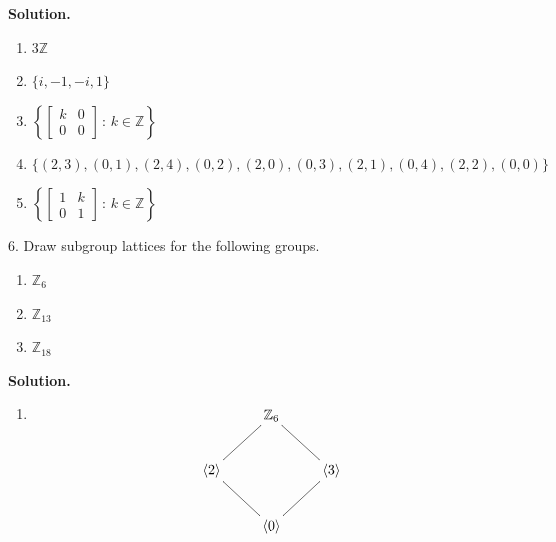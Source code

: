 \documentclass[10pt,]{book}
\theoremstyle{plain}
\theoremstyle{definition}
\theoremstyle{definition}
\theoremstyle{definition}
\theoremstyle{definition}
\numberwithin{equation}{section}
\def\Z{\mathbb{Z}}
\newcommand{\amp}{ & }
\begin{document}
\begin{exerciselist}
\par\smallskip
\par\smallskip
\noindent\textbf{Solution.}\hypertarget{solution-38}{}\quad
\leavevmode%
\begin{enumerate}[label=(\alph*)]
\item\hypertarget{li-310}{}
          \(3\Z\)
\item\hypertarget{li-311}{}
          \(\{i,-1,-i,1\}\)
\item\hypertarget{li-312}{}
          \(\left\{\left[
          \begin{array}{cc}
          k \amp  0 \\
          0 \amp  0
          \end{array} 
          \right]\,:\,k\in \Z
          \right\}\)
\item\hypertarget{li-313}{}
          \(\{(2,3),(0,1),(2,4),(0,2),(2,0),(0,3),(2,1),(0,4),(2,2),(0,0)\}\)
\item\hypertarget{li-314}{}
          \(\left\{\left[
          \begin{array}{cc}
          1 \amp  k \\
          0 \amp  1
          \end{array} 
          \right]\,:\,k\in \Z\right\}\)
\end{enumerate}
\item[6.]\hypertarget{exercise-39}{}
        Draw subgroup lattices for the following groups.
        \leavevmode%
\begin{multicols}{3}
\begin{enumerate}[label=(\alph*)]
\item\hypertarget{li-315}{}
              \(\Z_6\)
\item\hypertarget{li-316}{}
              \(\Z_{13}\)
\item\hypertarget{li-317}{}
              \(\Z_{18}\)
\end{enumerate}
\end{multicols}

\par\smallskip
\par\smallskip
\noindent\textbf{Solution.}\hypertarget{solution-39}{}\quad
\leavevmode%
\begin{enumerate}[label=(\alph*)]
\item\hypertarget{li-318}{}
    {
\[\xymatrix{&\Z_6&\\ \langle 2\rangle \ar@{-}[ur]&&\langle 3\rangle\ar@{-}[ul]\\&\langle 0\rangle \ar@{-}[ul]\ar@{-}[ur]&}\]
}



\end{enumerate}
\end{exerciselist}
\end{document}
